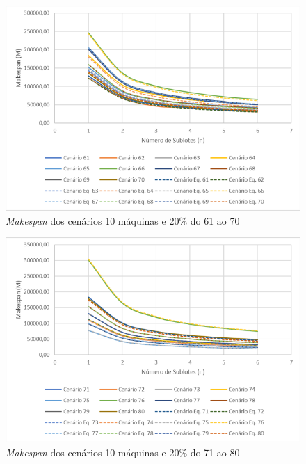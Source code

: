 \begin{figure}[H]
    \centering
     \includegraphics[width=13cm]{Apendices/Figuras/10m20_61-70.png}
     \caption{\textit{Makespan} dos cenários 10 máquinas e 20\% do 61 ao 70}
    \label{fig:10m20_61-70}
\end{figure}

\begin{figure}[H]
    \centering
     \includegraphics[width=13cm]{Apendices/Figuras/10m20_71-80.png}
     \caption{\textit{Makespan} dos cenários 10 máquinas e 20\% do 71 ao 80}
    \label{fig:10m20_71-80}
\end{figure}

